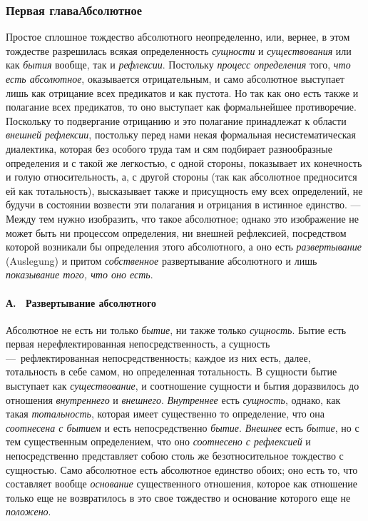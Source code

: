 \subsubsection{Первая главаАбсолютное}
Простое сплошное тождество абсолютного
неопределенно, или, вернее, в этом тождестве разрешилась всякая
определенность {\em сущности} и
{\em существования} или как
{\em бытия} вообще, так и
{\em рефлексии}. Постольку
{\em процесс определения} того,
{\em что есть абсолютное}, оказывается отрицательным, и
само абсолютное выступает лишь как отрицание всех предикатов и как пустота.
Но так как оно есть также и полагание всех предикатов, то оно выступает как
формальнейшее противоречие. Поскольку то подвергание отрицанию и это
полагание принадлежат к области {\em внешней
рефлексии}, постольку перед нами некая формальная несистематическая
диалектика, которая без особого труда там и сям подбирает разнообразные
определения и с такой же легкостью, с одной стороны, показывает их
конечность и голую относительность, а, с другой стороны (так как абсолютное
предносится ей как тотальность), высказывает также и присущность ему всех
определений, не будучи в состоянии возвести эти полагания и отрицания в
истинное единство. — Между тем нужно изобразить, что такое абсолютное;
однако это изображение не может быть ни процессом определения, ни внешней
рефлексией, посредством которой возникали бы определения этого абсолютного,
а оно есть {\em развертывание} (Auslegung) и притом
{\em собственное} развертывание абсолютного и лишь
{\em показывание того, что оно есть}.

\paragraph[А. \ Развертывание абсолютного]{А. \ Развертывание абсолютного}
\hypertarget{Toc478978760}{}Абсолютное не есть ни только
{\em бытие}, ни также только
{\em сущность}. Бытие есть первая нерефлектированная
непосредственность, а сущность —~рефлектированная непосредственность;
каждое из них есть, далее, тотальность в себе самом, но определенная
тотальность. В сущности бытие выступает как
{\em существование}, и соотношение сущности и бытия
доразвилось до отношения {\em внутреннего} и
{\em внешнего}. {\em Внутреннее}
есть {\em сущность}, однако, как такая
{\em тотальность}, которая имеет существенно то
определение, что она {\em соотнесена с бытием} и есть
непосредственно {\em бытие}.
{\em Внешнее} есть {\em бытие}, но
с тем существенным определением, что оно
{\em соотнесено с рефлексией} и непосредственно
представляет собою столь же безотносительное тождество с сущностью. Само
абсолютное есть абсолютное единство обоих; оно есть то, что составляет
вообще {\em основание} существенного отношения, которое
как отношение только еще не возвратилось в это свое тождество и основание
которого еще не {\em положено}.

